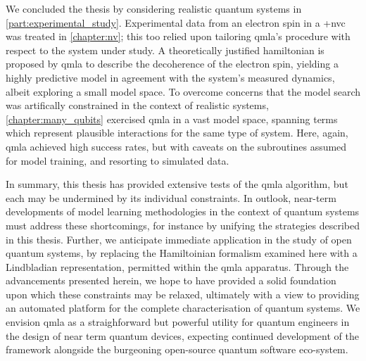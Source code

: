We concluded the thesis by considering realistic quantum systems in \cref{part:experimental_study}. 
Experimental data from an electron spin in a \glsxtrlong+{nvc} was treated in \cref{chapter:nv};
    this too relied upon tailoring \gls{qmla}'s procedure with respect to the system under study.
A theoretically justified \gls{hamiltonian} is proposed by \gls{qmla} to describe the decoherence of the electron spin, 
    yielding a highly predictive model in agreement with the system's measured dynamics, 
    albeit exploring a small model space. 
To overcome concerns that the model search was artifically constrained in the context of realistic systems, 
    \cref{chapter:many_qubits} exercised \gls{qmla} in a vast model space, 
    spanning terms which represent plausible interactions for the same type of system. 
Here, again, \gls{qmla} achieved high success rates, but with caveats on the subroutines assumed for model training, 
    and resorting to simulated data. 
\par

In summary, this thesis has provided extensive tests of the \gls{qmla} algorithm, 
    but each may be undermined by its individual constraints. 
In outlook, near-term developments of model learning methodologies in the context of quantum systems
    must address these shortcomings, for instance by unifying the strategies described in this thesis. 
Further, we anticipate immediate application in the study of open quantum systems, 
    by replacing the Hamiltoinian formalism examined here with a Lindbladian representation, 
    permitted within the \gls{qmla} apparatus.    
Through the advancements presented herein, we hope to have provided a solid foundation upon which these constraints may be relaxed, 
    ultimately with a view to providing an automated platform for the complete characterisation of quantum systems.
We envision \gls{qmla} as a straighforward but powerful utility for quantum engineers in the design of near term quantum devices, 
    expecting continued development of the framework alongside the burgeoning open-source quantum software eco-system. 
\par



